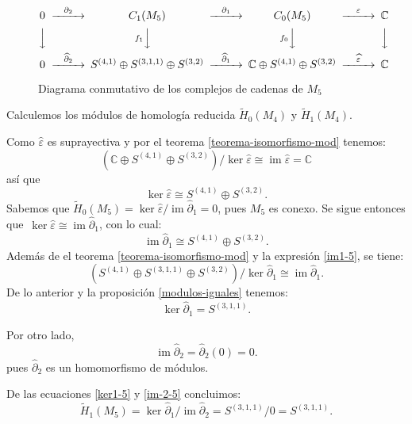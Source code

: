 \documentclass[12pt]{book}
\theoremstyle{definition}
\DeclareMathOperator{\im}{im}
\newcounter{in}
\begin{document}
\begin{figure}[h]
  \centering
    \[
    \begin{CD}
      0 @>{\partial_{2}}>> C_{1}(M_{5}) @>{\partial_{1}}>> C_{0}(M_{5}) @>{\varepsilon}>> \mathbb{C}\\
      @VVV   @Vf_{1} VV   @Vf_{0} VV   @VVV    \\
      0 @>{\widehat\partial_{2}}>> S^{(4,1)}\oplus S^{(3,1,1)}\oplus
      S^{(3,2)} @>{\widehat\partial_{1}}>> \mathbb{C}\oplus S^{(4,1)}
      \oplus S^{(3,2)} @>{\widehat \varepsilon}>> \mathbb{C}
    \end{CD}
    \]

    \caption{Diagrama conmutativo de los complejos de cadenas de
      $M_{5}$}
\label{fig:diagrama-conmutativo5}
\end{figure}

Calculemos los módulos de homología reducida $\widetilde H_{0}(M_{4})$ y
$\widetilde H_{1}(M_{4})$.

Como $\widehat\varepsilon$ es suprayectiva y por el teorema \ref{teorema-isomorfismo-mod} tenemos:
$$(\mathbb{C}\oplus S^{(4,1)} \oplus
S^{(3,2)})/\ker\widehat\varepsilon\cong\im\widehat\varepsilon=\mathbb{C}$$
así que
\begin{equation*}
  \label{ker0-5}
  \ker\widehat\varepsilon\cong S^{(4,1)} \oplus S^{(3,2)}.
\end{equation*}
Sabemos que $\widetilde H_{0}(M_{5})=\ker \widehat\varepsilon/\im
\widehat\partial_{1}=0$, pues $M_{5}$  es
conexo. Se sigue entonces que~$\ker \widehat\varepsilon\cong
\im\widehat\partial_{1}$, con lo cual:
\begin{equation}
  \label{im1-5}
  \im \widehat\partial_{1}\cong S^{(4,1)} \oplus S^{(3,2)}.
\end{equation}
Además de el teorema \ref{teorema-isomorfismo-mod} y la expresión \ref{im1-5}, se tiene:
$$(S^{(4,1)}\oplus S^{(3,1,1)}\oplus S^{(3,2)})/\ker
\widehat\partial_{1}\cong \im \widehat\partial_{1}.$$
De lo anterior y la proposición \ref{modulos-iguales} tenemos:
\begin{equation}
  \label{ker1-5}
  \ker \widehat\partial_{1}= S^{(3,1,1)}.
\end{equation}

Por otro lado,
\begin{equation}
  \im\widehat\partial_{2}=\widehat\partial_{2}(0)=0.
  \label{im-2-5}
\end{equation}
pues $\widehat\partial_{2}$ es un homomorfismo de módulos.

De las ecuaciones \ref{ker1-5} y \ref{im-2-5} concluimos:
\begin{equation*}
  \widetilde H_{1}(M_{5})=\ker \widehat\partial_{1}/\im \widehat\partial_{2}=S^{(3,1,1)}/0=S^{(3,1,1)}.
\end{equation*}
 
\end{document}
